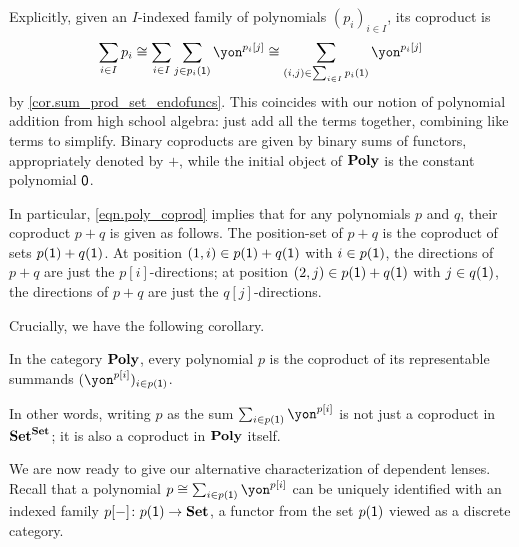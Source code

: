 \documentclass[Book-Poly]{subfiles}
\begin{document}
Explicitly, given an $I$-indexed family of polynomials $(p_i)_{i \in I}$, its coproduct is
\begin{equation} \label{eqn.poly_coprod}
  \sum_{i \in I} p_i \iso \sum_{i \in I} \sum_{j \in p_i(\1)} \yon^{p_i[j]} \iso \sum_{(i,j) \in \sum_{i \in I} p_i(\1)} \yon^{p_i[j]}
\end{equation}
by \cref{cor.sum_prod_set_endofuncs}.
This coincides with our notion of polynomial addition from high school algebra: just add all the terms together, combining like terms to simplify.
Binary coproducts are given by binary sums of functors, appropriately denoted by $+$, while the initial object of $\mathbf{Poly}$ is the constant polynomial $\textsf{0}$.

In particular, \eqref{eqn.poly_coprod} implies that for any polynomials $p$ and $q$, their coproduct $p+q$ is given as follows.
The position-set of $p+q$ is the coproduct of sets $p(\textsf{1}) + q(\textsf{1})$.
At position $(1,i) \in p(\textsf{1}) + q(\textsf{1})$ with $i \in p(\textsf{1})$, the directions of $p+q$ are just the $p[i]$-directions; at position $(2,j) \in p(\textsf{1}) + q(\textsf{1})$ with $j \in q(\textsf{1})$, the directions of $p+q$ are just the $q[j]$-directions.


Crucially, we have the following corollary.

\begin{corollary} \label{cor.poly-coprod-repr}
  In the category $\mathbf{Poly}$, every polynomial $p$ is the coproduct of its representable summands $(\yon^{p[i]})_{i\in p(\1)}$.
\end{corollary}

In other words, writing $p$ as the sum $\sum_{i\in p(\1)}\yon^{p[i]}$ is not just a coproduct in $\mathbf{Set}^{\mathbf{Set}}$; it is also a coproduct in $\mathbf{Poly}$ itself.

We are now ready to give our alternative characterization of dependent lenses.
Recall that a polynomial $p\iso\sum_{i\in p(\1)}\yon^{p[i]}$ can be uniquely identified with an indexed family $p[-]\colon p(\textsf{1})\to\mathbf{Set}$, a functor from the set $p(\textsf{1})$ viewed as a discrete category.
\end{document}
